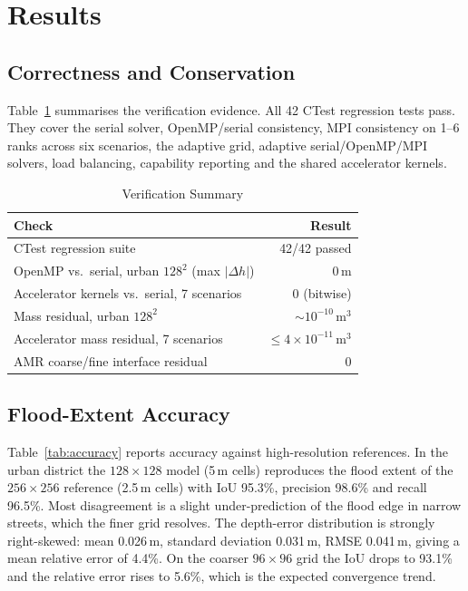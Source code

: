 \documentclass[conference]{IEEEtran}
\begin{document}
\section{Results}
\subsection{Correctness and Conservation}
Table~\ref{tab:validation} summarises the verification evidence. All 42
CTest regression tests pass. They cover the serial solver, OpenMP/serial
consistency, MPI consistency on 1--6 ranks across six scenarios, the adaptive
grid, adaptive serial/OpenMP/MPI solvers, load balancing, capability
reporting and the shared accelerator kernels.

\begin{table}[t]
\caption{Verification Summary}
\label{tab:validation}
\centering
\begin{tabular}{@{}lr@{}}
\toprule
Check & Result \\
\midrule
CTest regression suite & 42/42 passed \\
OpenMP vs.\ serial, urban $128^2$ (max $\lvert\Delta h\rvert$) & 0\,m \\
Accelerator kernels vs.\ serial, 7 scenarios & 0 (bitwise) \\
Mass residual, urban $128^2$ & $\sim\!10^{-10}$\,m$^3$ \\
Accelerator mass residual, 7 scenarios & $\le 4\times10^{-11}$\,m$^3$ \\
AMR coarse/fine interface residual & 0 \\
\bottomrule
\end{tabular}
\end{table}

\subsection{Flood-Extent Accuracy}
Table~\ref{tab:accuracy} reports accuracy against high-resolution references.
In the urban district the $128\times128$ model (5\,m cells) reproduces the flood
extent of the $256\times256$ reference (2.5\,m cells) with IoU 95.3\%,
precision 98.6\% and recall 96.5\%. Most disagreement is a slight
under-prediction of the flood edge in narrow streets, which the finer grid
resolves. The depth-error distribution is strongly right-skewed: mean
0.026\,m, standard deviation 0.031\,m, RMSE 0.041\,m, giving a mean relative
error of 4.4\%. On the coarser $96\times96$ grid the IoU drops to 93.1\% and
the relative error rises to 5.6\%, which is the expected convergence trend.
\end{document}
